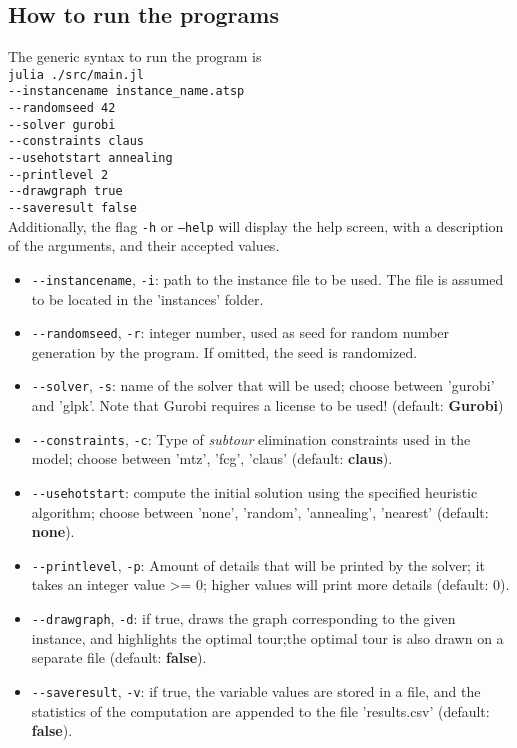 \documentclass[
12pt,
a4paper,
oneside,
headinclude,
footinclude]{article}
\begin{document}
    \subsection{\textbf{How to run the programs}}
    The generic syntax to run the program is\\
    \-\quad\texttt{julia ./src/main.jl} \\
    \-\quad\quad\texttt{-{}-instancename instance\_name.atsp} \\
    \-\quad\quad\texttt{-{}-randomseed 42} \\
    \-\quad\quad\texttt{-{}-solver gurobi} \\
    \-\quad\quad\texttt{-{}-constraints claus} \\
    \-\quad\quad\texttt{-{}-usehotstart annealing} \\
    \-\quad\quad\texttt{-{}-printlevel 2} \\
    \-\quad\quad\texttt{-{}-drawgraph true} \\
    \-\quad\quad\texttt{-{}-saveresult false} \\
    
    Additionally, the flag \texttt{-h} or \texttt{--help} will display the help screen, with a description of the arguments, and their accepted values.
    
    \begin{itemize}
        \item \texttt{-{}-instancename}, \texttt{-i}: path to the instance file to be used. The file is assumed to be located in the 'instances' folder.
        \item \texttt{-{}-randomseed}, \texttt{-r}: integer number, used as seed for random number generation by the program. If omitted, the seed is randomized.
        \item \texttt{-{}-solver}, \texttt{-s}: name of the solver that will be used; choose between 'gurobi' and 'glpk'. Note that Gurobi requires a license to be used! (default: \textbf{Gurobi})
        \item \texttt{-{}-constraints}, \texttt{-c}: Type of \textit{subtour} elimination constraints used in the model; choose between 'mtz', 'fcg', 'claus' (default: \textbf{claus}).
        \item \texttt{-{}-usehotstart}: compute the initial solution using the specified heuristic algorithm; choose between 'none', 'random', 'annealing', 'nearest' (default: \textbf{none}).
        \item \texttt{-{}-printlevel}, \texttt{-p}: Amount of details that will be printed by the solver; it takes an integer value >= 0; higher values will print more details (default: \textbf{$0$}). 
        \item \texttt{-{}-drawgraph}, \texttt{-d}: if true, draws the graph corresponding to the given instance, and highlights the optimal tour;the optimal tour is also drawn on a separate file (default: \textbf{false}).
        \item \texttt{-{}-saveresult}, \texttt{-v}: if true, the variable values are stored in a file, and the statistics of the computation are appended to the file 'results.csv' (default: \textbf{false}).
    \end{itemize}
    
\end{document}

